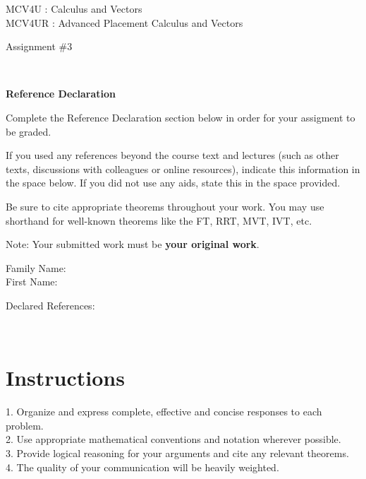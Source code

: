 \documentclass[12pt]{book}
\begin{document}
\vspace{-1.0in}\begin{center}
\Large{MCV4U : Calculus and Vectors}\\
\Large{MCV4UR : Advanced Placement Calculus and Vectors }

\Large{Assignment \#3}


\end{center}


\vspace{0.015in}\hrulefill\ 

\textbf{Reference Declaration} %

Complete the Reference Declaration section below in order for your assigment to be graded.

If you used any references beyond the course text and lectures (such as other texts, discussions with colleagues or online resources), indicate this information in the space below.  If you did not use any aids, state this in the space provided. 

Be sure to cite appropriate theorems throughout your work. You may use shorthand for well-known theorems like the FT, RRT, MVT, IVT, etc. 

Note: Your submitted work must be \textbf{your original work}. 

Family Name: \\%
First Name: %

Declared References: 


\vspace{0.015in}\hrulefill\ 

\newpage

\section*{Instructions}

\begin{center}
\setlength{\fboxrule}{2pt}
\begin{boxedminipage}{6.5in}
1.	Organize and express complete, effective and concise responses to each problem.\\
2.	Use appropriate mathematical conventions and notation wherever possible.\\
3.	Provide logical reasoning for your arguments and cite any relevant theorems. \\
4.  The quality of your communication will be heavily weighted.
\end{boxedminipage}
\end{center} 
\end{document}
